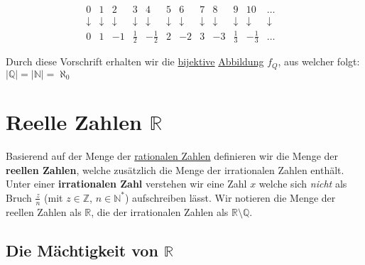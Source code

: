 \documentclass[../../main.tex]{subfiles}
\begin{document}
\begin{itemize}
			$$			
			\begin{matrix}
			0 & 1 & 2           & 3 & 4           & 5 & 6 & 7 & 8 & 9 & 10 & \dots \\
			\downarrow & \downarrow & \downarrow & \downarrow & \downarrow & \downarrow & \downarrow & \downarrow & \downarrow & \downarrow & \downarrow & \downarrow & \\
			0 & 1 & -1 & \frac{1}{2} & -\frac{1}{2} & 2 & -2 & 3 & -3 & \frac{1}{3} & - \frac{1}{3} & \dots
			\end{matrix}
			$$
			
			Durch diese Vorschrift erhalten wir die \hyperref[def:Bijektiv]{bijektive} \hyperref[def:Abbildung]{Abbildung} $f_Q$, aus welcher folgt: $|\mathbb{Q}| = |\mathbb{N}| = \aleph_0$
		
		\end{itemize}
		
		\section{Reelle Zahlen $\mathbb{R}$}		
		
		\begin{definition}
			\label{def:ReelleZahlen}
			\label{def:irrationaleZahl}
			Basierend auf der Menge der \hyperref[def:RationaleZahlen]{rationalen Zahlen} definieren wir die Menge der \textbf{reellen Zahlen}, welche zusätzlich die Menge der irrationalen Zahlen enthält. Unter einer \textbf{irrationalen Zahl} verstehen wir eine Zahl $x$ welche sich \textit{nicht} als Bruch $\frac{z}{n}$ (mit $z \in \mathbb{Z}$, $n \in \mathbb{N}^*$) aufschreiben lässt. Wir notieren die Menge der reellen Zahlen als $\mathbb{R}$, die der irrationalen Zahlen als $\mathbb{R} \setminus \mathbb{Q}$.
		\end{definition}
	
		\subsection*{Die Mächtigkeit von $\mathbb{R}$}
	
\end{document}
